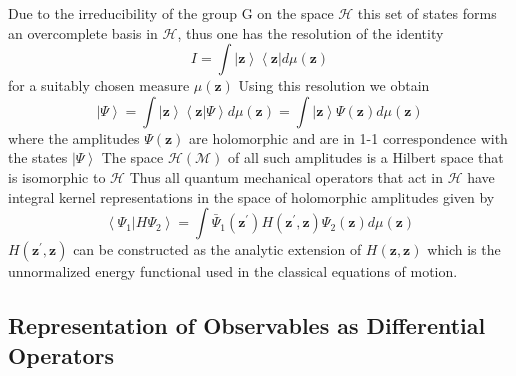 \documentclass[aps,preprint]{revtex4}%
\begin{document}
Due to the irreducibility of the group G on the space $\mathcal{H}$ this set
of states forms an overcomplete basis in $\mathcal{H}$, thus one has the
resolution of the identity
\begin{equation}
I=\int\left\vert \mathbf{z}\right\rangle \left\langle \mathbf{z}\right\vert
d\mu\left(  \mathbf{z}\right)
\end{equation}
for a suitably chosen measure $\mu\left(  \mathbf{z}\right)  $ Using this
resolution we obtain
\begin{equation}
\left\vert \Psi\right\rangle =\int\left\vert \mathbf{z}\right\rangle
\left\langle \mathbf{z}\right\vert \left.  \Psi\right\rangle d\mu\left(
\mathbf{z}\right)  =\int\left\vert \mathbf{z}\right\rangle \Psi\left(
\mathbf{z}\right)  d\mu\left(  \mathbf{z}\right)
\end{equation}
where the amplitudes $\Psi\left(  \mathbf{z}\right)  $ are holomorphic and are
in 1-1 correspondence with the states $\left\vert \Psi\right\rangle $ The
space $\mathcal{H}\left(  \mathcal{M}\right)  $ of all such amplitudes is a
Hilbert space that is isomorphic to $\mathcal{H}$ Thus all quantum mechanical
operators that act in $\mathcal{H}$ have integral kernel representations in
the space of holomorphic amplitudes given by
\begin{equation}
\left\langle \left.  \Psi_{1}\right\vert H\Psi_{2}\right\rangle =\int\bar
{\Psi}_{1}\left(  \mathbf{z}^{\prime}\right)  H\left(  \mathbf{z}^{\prime
}\mathbf{,z}\right)  \Psi_{2}\left(  \mathbf{z}\right)  d\mu\left(
\mathbf{z}\right)
\end{equation}
$H\left(  \mathbf{z}^{\prime}\mathbf{,z}\right)  $ can be constructed as the
analytic extension of $H\left(  \mathbf{z,z}\right)  $ which is the
unnormalized energy functional used in the classical equations of motion.

\subsection{Representation of Observables as Differential Operators}
\end{document}
